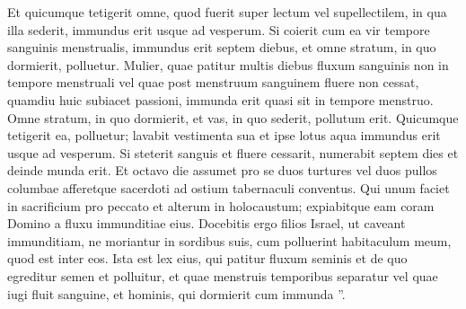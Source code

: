 \begin{biblechapter}
\begin{biblechapter}
\begin{biblechapter}
\begin{biblechapter}
\begin{biblechapter}
\begin{biblechapter}
\begin{biblechapter}
\begin{biblechapter}
\begin{biblechapter}
\begin{biblechapter}
\begin{biblechapter}
\begin{biblechapter}
\begin{biblechapter}
\begin{biblechapter}
\begin{biblechapter}
 \verse Et quicumque tetigerit omne, quod fuerit super lectum vel supellectilem, in qua illa sederit, immundus erit usque ad vesperum. 
\verse Si coierit cum ea vir tempore sanguinis menstrualis, immundus erit septem diebus, et omne stratum, in quo dormierit, polluetur.
 \verse Mulier, quae patitur multis diebus fluxum sanguinis non in tempore menstruali vel quae post menstruum sanguinem fluere non cessat, quamdiu huic subiacet passioni, immunda erit quasi sit in tempore menstruo. 
\verse Omne stratum, in quo dormierit, et vas, in quo sederit, pollutum erit. 
\verse Quicumque tetigerit ea, polluetur; lavabit vestimenta sua et ipse lotus aqua immundus erit usque ad vesperum. 
\verse Si steterit sanguis et fluere cessarit, numerabit septem dies et deinde munda erit. 
\verse Et octavo die assumet pro se duos turtures vel duos pullos columbae afferetque sacerdoti ad ostium tabernaculi conventus. 
\verse Qui unum faciet in sacrificium pro peccato et alterum in holocaustum; expiabitque eam coram Domino a fluxu immunditiae eius.
 \verse Docebitis ergo filios Israel, ut caveant immunditiam, ne moriantur in sordibus suis, cum polluerint habitaculum meum, quod est inter eos. 
\verse Ista est lex eius, qui patitur fluxum seminis et de quo egreditur semen et polluitur, 
 \verse et quae menstruis temporibus separatur vel quae iugi fluit sanguine, et hominis, qui dormierit cum immunda ”.
 

\end{biblechapter}
\end{biblechapter}
\end{biblechapter}
\end{biblechapter}
\end{biblechapter}
\end{biblechapter}
\end{biblechapter}
\end{biblechapter}
\end{biblechapter}
\end{biblechapter}
\end{biblechapter}
\end{biblechapter}
\end{biblechapter}
\end{biblechapter}
\end{biblechapter}
